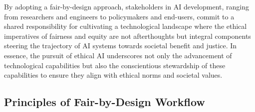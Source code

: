 \documentclass[12pt,a4paper,openright,twoside]{book}
\begin{document}
By adopting a fair-by-design approach, stakeholders in AI development, ranging from researchers and engineers to policymakers and end-users, commit to a shared responsibility for cultivating a technological landscape where the ethical imperatives of fairness and equity are not afterthoughts but integral components steering the trajectory of AI systems towards societal benefit and justice. In essence, the pursuit of ethical AI underscores not only the advancement of technological capabilities but also the conscientious stewardship of these capabilities to ensure they align with ethical norms and societal values.

\subsection{Principles of Fair-by-Design Workflow}
\label{subsection:workflow-principles}
\end{document}
